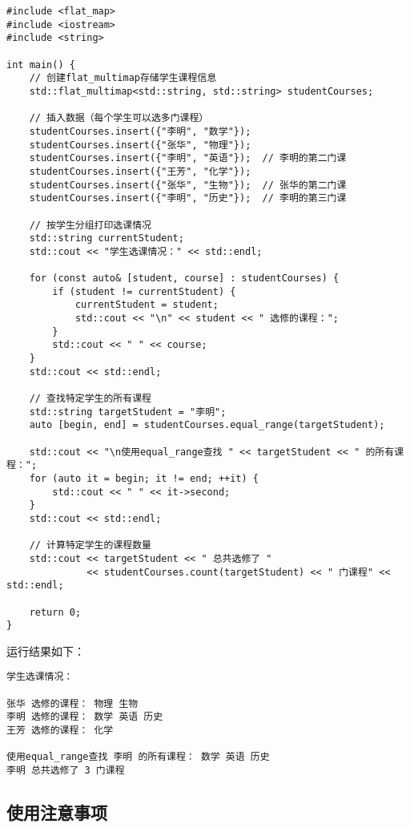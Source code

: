 \documentclass[a4paper, 12pt]{article}
\begin{document}
\begin{lstlisting}[style=cpp]
#include <flat_map>
#include <iostream>
#include <string>

int main() {
    // 创建flat_multimap存储学生课程信息
    std::flat_multimap<std::string, std::string> studentCourses;
    
    // 插入数据（每个学生可以选多门课程）
    studentCourses.insert({"李明", "数学"});
    studentCourses.insert({"张华", "物理"});
    studentCourses.insert({"李明", "英语"});  // 李明的第二门课
    studentCourses.insert({"王芳", "化学"});
    studentCourses.insert({"张华", "生物"});  // 张华的第二门课
    studentCourses.insert({"李明", "历史"});  // 李明的第三门课
    
    // 按学生分组打印选课情况
    std::string currentStudent;
    std::cout << "学生选课情况：" << std::endl;
    
    for (const auto& [student, course] : studentCourses) {
        if (student != currentStudent) {
            currentStudent = student;
            std::cout << "\n" << student << " 选修的课程：";
        }
        std::cout << " " << course;
    }
    std::cout << std::endl;
    
    // 查找特定学生的所有课程
    std::string targetStudent = "李明";
    auto [begin, end] = studentCourses.equal_range(targetStudent);
    
    std::cout << "\n使用equal_range查找 " << targetStudent << " 的所有课程：";
    for (auto it = begin; it != end; ++it) {
        std::cout << " " << it->second;
    }
    std::cout << std::endl;
    
    // 计算特定学生的课程数量
    std::cout << targetStudent << " 总共选修了 " 
              << studentCourses.count(targetStudent) << " 门课程" << std::endl;
    
    return 0;
}
\end{lstlisting}

运行结果如下：

\begin{lstlisting}[style=cpp]
学生选课情况：

张华 选修的课程： 物理 生物
李明 选修的课程： 数学 英语 历史
王芳 选修的课程： 化学

使用equal_range查找 李明 的所有课程： 数学 英语 历史
李明 总共选修了 3 门课程
\end{lstlisting}

\subsection{使用注意事项}
\end{document}
